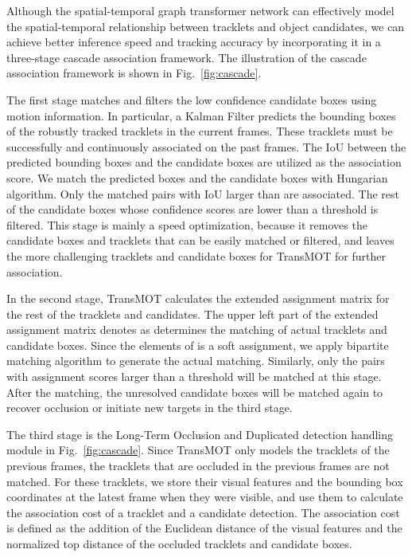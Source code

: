 \documentclass[10pt,twocolumn,letterpaper]{article}
\newcommand{\tb}{}
\begin{document}
Although the spatial-temporal graph transformer network can effectively model the spatial-temporal relationship between tracklets and \tb{object} candidates, we can achieve better inference speed and tracking accuracy by incorporating it in a three-stage cascade association framework. The illustration of the cascade association framework is shown in Fig.~\ref{fig:cascade}. 


The first stage matches and filters the low confidence candidate boxes using motion information. 
In particular, a Kalman Filter predicts the bounding boxes of the robustly tracked tracklets in the current frames.
These tracklets must be successfully and continuously associated on the past  frames. 
The IoU between the predicted bounding boxes and the candidate boxes are utilized as the association score.
We match the predicted boxes and the candidate boxes with Hungarian algorithm.
Only the matched pairs with IoU larger than  are associated.
The rest of the candidate boxes whose confidence scores are lower than a threshold is filtered.
This stage is mainly a speed optimization, because it removes the candidate boxes and tracklets that can be easily matched or filtered, and leaves the more challenging tracklets and candidate boxes for TransMOT for further association.

In the second stage, TransMOT calculates the extended assignment matrix for the rest of the tracklets and candidates. 
The upper left part of the extended assignment matrix  denotes as  determines the matching of actual tracklets and candidate boxes. Since the elements of  is a soft assignment, we apply bipartite matching algorithm to 
generate the actual matching. Similarly, only the pairs with assignment scores larger than a threshold will be matched at this stage. After the matching, the unresolved candidate boxes will be matched again to recover occlusion or initiate new targets in the third stage. 

The third stage is the Long-Term Occlusion and Duplicated detection handling module in Fig.~\ref{fig:cascade}. 
Since TransMOT only models the tracklets of the previous  frames, the tracklets that are occluded in the previous  frames are not matched.
For these tracklets, we store their visual features and the bounding box coordinates at the latest frame when they were visible, and use them to calculate the association cost of a tracklet and a candidate detection.
The association cost is defined as the addition of the Euclidean distance of the visual features and the normalized top distance of the occluded tracklets and candidate boxes.
\end{document}
